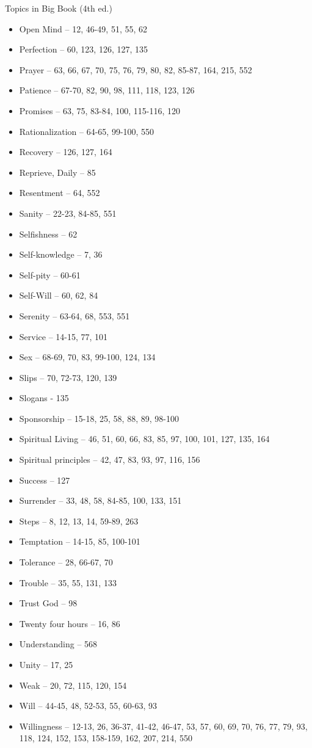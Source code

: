 \documentclass{beamer}
\begin{document}
\begin{frame}{Topics in Big Book (4th ed.)}
\begin{itemize}
\item Open Mind – 12, 46-49, 51, 55, 62 \item Perfection – 60, 123, 126, 127, 135\item Prayer – 63, 66, 67, 70, 75, 76, 79, 80, 82, 85-87, 164, 215, 552\item Patience – 67-70, 82, 90, 98, 111, 118, 123, 126 \item Promises – 63, 75, 83-84, 100, 115-116, 120\item Rationalization – 64-65, 99-100, 550\item Recovery – 126, 127, 164\item Reprieve, Daily – 85 \item Resentment – 64, 552\item Sanity – 22-23, 84-85, 551\item Selfishness – 62\item Self-knowledge – 7, 36\item Self-pity – 60-61\item Self-Will – 60, 62, 84\item Serenity – 63-64, 68, 553, 551\item Service – 14-15, 77, 101\item Sex – 68-69, 70, 83, 99-100, 124, 134\item Slips – 70, 72-73, 120, 139\item Slogans - 135\item Sponsorship – 15-18, 25, 58, 88, 89, 98-100\item Spiritual Living – 46, 51, 60, 66, 83, 85, 97, 100, 101, 127, 135, 164\item Spiritual principles – 42, 47, 83, 93, 97, 116, 156 \item Success – 127\item Surrender – 33, 48, 58, 84-85, 100, 133, 151\item Steps – 8, 12, 13, 14, 59-89, 263 \item Temptation – 14-15, 85, 100-101\item Tolerance – 28, 66-67, 70\item Trouble – 35, 55, 131, 133\item Trust God – 98\item Twenty four hours – 16, 86\item Understanding – 568\item Unity – 17, 25\item  Weak – 20, 72, 115, 120, 154\item Will – 44-45, 48, 52-53, 55, 60-63, 93\item Willingness – 12-13, 26, 36-37, 41-42, 46-47, 53, 57, 60, 69, 70, 76, 77, 79, 93, 118, 124, 152, 153, 158-159, 162, 207, 214, 550  
\end{itemize}
\end{frame}
\end{document}
